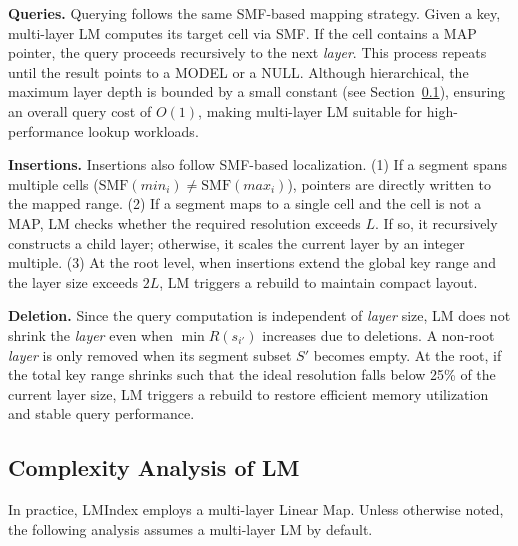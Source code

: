 \textbf{Queries.} Querying follows the same SMF-based mapping strategy. Given a key, multi-layer LM computes its target cell via SMF. If the cell contains a MAP pointer, the query proceeds recursively to the next \textit{layer}. This process repeats until the result points to a MODEL or a NULL. Although hierarchical, the maximum layer depth is bounded by a small constant (see Section~\ref{sec:ca-lm}), ensuring an overall query cost of $O(1)$, making multi-layer LM suitable for high-performance lookup workloads.


\textbf{Insertions.} Insertions also follow SMF-based localization. (1) If a segment spans multiple cells ($\text{SMF}(min_i) \ne \text{SMF}(max_i)$), pointers are directly written to the mapped range. (2) If a segment maps to a single cell and the cell is not a MAP, LM checks whether the required resolution exceeds $\mathit{L}$. If so, it recursively constructs a child layer; otherwise, it scales the current layer by an integer multiple. (3) At the root level, when insertions extend the global key range and the layer size exceeds $2\mathit{L}$, LM triggers a rebuild to maintain compact layout.

\textbf{Deletion.} Since the query computation is independent of \textit{layer} size, LM does not shrink the \textit{layer} even when $\min R(s_{i'})$ increases due to deletions. A non-root \textit{layer} is only removed when its segment subset $S'$ becomes empty. At the root, if the total key range shrinks such that the ideal resolution falls below 25\% of the current layer size, LM triggers a rebuild to restore efficient memory utilization and stable query performance.

\subsection{Complexity Analysis of LM}
\label{sec:ca-lm}
In practice, LMIndex employs a multi-layer Linear Map. Unless otherwise noted, the following analysis assumes a multi-layer LM by default.


